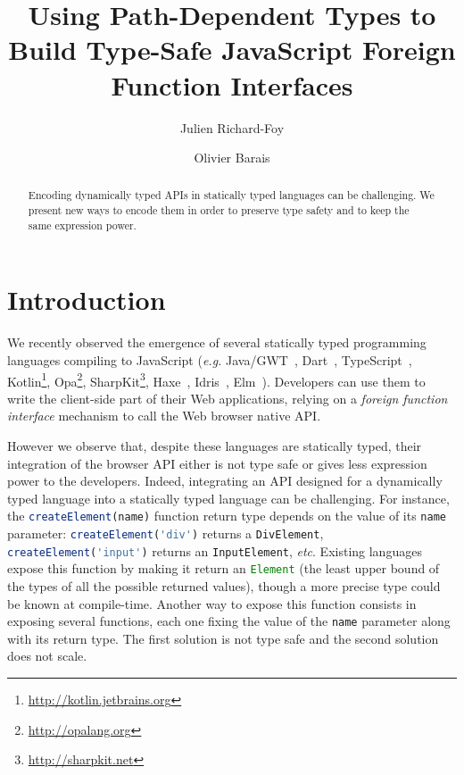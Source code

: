 \documentclass{llncs}
\newcommand{\jscode}[1]{\lstinline[language=JavaScript]|#1|}
\begin{document}
 \title{Using Path-Dependent Types to Build Type-Safe JavaScript Foreign Function Interfaces}

 \author{Julien Richard-Foy \and Olivier Barais}



 \maketitle

\begin{abstract}
Encoding dynamically typed APIs in statically typed languages can be challenging. We present new ways to encode them in order to preserve type safety and to keep the same expression power.
\end{abstract}

\section{Introduction}

We recently observed the emergence of several statically typed programming languages compiling to JavaScript (\emph{e.g.} Java/GWT~\cite{Kereki09_GWT}, Dart~\cite{Griffith11_Dart}, TypeScript~\cite{fenton2012typescript}, Kotlin\footnote{\href{http://kotlin.jetbrains.org}{http://kotlin.jetbrains.org}}, Opa\footnote{\href{http://opalang.org}{http://opalang.org}}, SharpKit\footnote{\href{http://sharpkit.net}{http://sharpkit.net}}, Haxe~\cite{Cannasse08_HaXe}, Idris~\cite{Brady13_Idris}, Elm~\cite{czaplicki2012elm}). Developers can use them to write the client-side part of their Web applications, relying on a \emph{foreign function interface} mechanism to call the Web browser native API.

However we observe that, despite these languages are statically typed, their integration of the browser API either is not type safe or gives less expression power to the developers. Indeed, integrating an API designed for a dynamically typed language into a statically typed language can be challenging. For instance, the \jscode{createElement(name)} function return type depends on the value of its \jscode{name} parameter: \jscode{createElement('div')} returns a \jscode{DivElement}, \jscode{createElement('input')} returns an \jscode{InputElement}, \emph{etc}. Existing languages expose this function by making it return an \jscode{Element} (the least upper bound of the types of all the possible returned values), though a more precise type could be known at compile-time. Another way to expose this function consists in exposing several functions, each one fixing the value of the \jscode{name} parameter along with its return type. The first solution is not type safe and the second solution does not scale.
\end{document}
